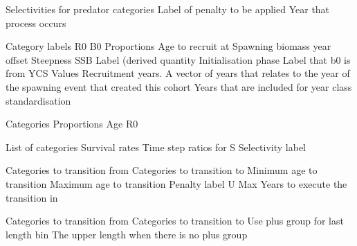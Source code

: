  {Selectivities for predator categories}
 {Label of penalty to be applied}
 {Year that process occurs}
\par\textbf{}\par
\par\textbf{}\par
{} {Category labels}
 {R0}
 {B0}
 {Proportions}
 {Age to recruit at}
 {Spawning biomass year offset}
 {Steepness}
 {SSB Label (derived quantity}
 {Initialisation phase Label that b0 is from}
 {YCS Values}
 {Recruitment years. A vector of years that relates to the year of the spawning event that created this cohort}
 {Years that are included for year class standardisation}
\par\textbf{}\par
{} {Categories}
 {Proportions}
 {Age}
 {R0}
\par\textbf{}\par
{} {List of categories}
 {Survival rates}
 {Time step ratios for S}
 {Selectivity label}
\par\textbf{}\par
{} {Categories to transition from}
 {Categories to transition to}
 {Minimum age to transition}
 {Maximum age to transition}
 {Penalty label}
 {U Max}
 {Years to execute the transition in}
 {}
 {}
 {}
 {}
 {}
 {}
\par\textbf{}\par
{} {Categories to transition from}
 {Categories to transition to}
 {Use plus group for last length bin}
 {The upper length when there is no plus group}
